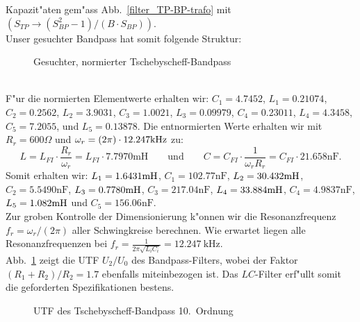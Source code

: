 Kapazit"aten gem"ass Abb.~\ref{filter_TP-BP-trafo} mit $(S_{TP}\rightarrow (S_{BP}^2-1)/(B\cdot S_{BP}))$.\\
\nit Unser gesuchter Bandpass hat somit folgende Struktur:\\
\begin{figure}[!htb]
\begin{center}\vspace*{-7mm} 
\vspace*{-3mm}\caption{Gesuchter, normierter Tschebyscheff-Bandpass}
\end{center}
\vspace*{-6mm}
\end{figure}\\
\nit F"ur die normierten Elementwerte erhalten wir: $C_1=4.7452$, $L_1=0.21074$, 
$C_2=0.2562$, $L_2=3.9031$, $C_3=1.0021$, $L_3=0.09979$, $C_4=0.23011$, $L_4=4.3458$, $C_5=7.2055$,
und $ L_5=0.13878$. Die entnormierten Werte erhalten wir mit $R_r=
600\Omega $ und $\omega_r=(2\pi)\cdot12.247 {\rm kHz}$ zu:
\[
L=L_{FI} \cdot \frac{R_r}{\omega_r}=L_{FI} \cdot 7.7970\mbox{mH}\qquad\text{und}\qquad 
C=C_{FI} \cdot \frac{1}{\omega_r R_r}=C_{FI} \cdot 21.658\mbox{nF}.
\]
Somit erhalten wir: $L_1=1.6431{\rm mH}$, $C_1=102.77\mbox{nF}$,
$L_2=30.432 {\rm mH}$,
$C_2=5.5490\mbox{nF}$, $L_3=0.7780 {\rm mH}$, $C_3=217.04\mbox{nF}$, $L_4=33.884 {\rm mH}$, $C_4=4.9837\mbox{nF}$, $L_5=1.082 {\rm mH}$ und $C_5=156.06\mbox{nF}$.\\
Zur groben Kontrolle der Dimensionierung k"onnen wir die
Resonanzfrequenz $f_r=\omega_r/(2\pi) $ aller
Schwingkreise berechnen. Wie erwartet liegen alle Resonanzfrequenzen
bei $f_r=\frac{1}{2\pi\sqrt{L_iC_i}}=12.247~\text{kHz}$.\\
Abb.~\ref{FIL_Bp_matlab} zeigt die UTF $U_2/U_0$ des Bandpass-Filters, wobei der Faktor $(R_1+R_2)/R_2=1.7$ ebenfalls miteinbezogen ist. Das $LC$-Filter erf"ullt somit die geforderten Spezifikationen bestens.\\
\begin{figure}[!htb]%
\begin{center}\vspace*{-3mm}   
\caption{UTF des Tschebyscheff-Bandpass 10.~Ordnung}\label{FIL_Bp_matlab}
\end{center}
\vspace*{-6mm}
\end{figure}



